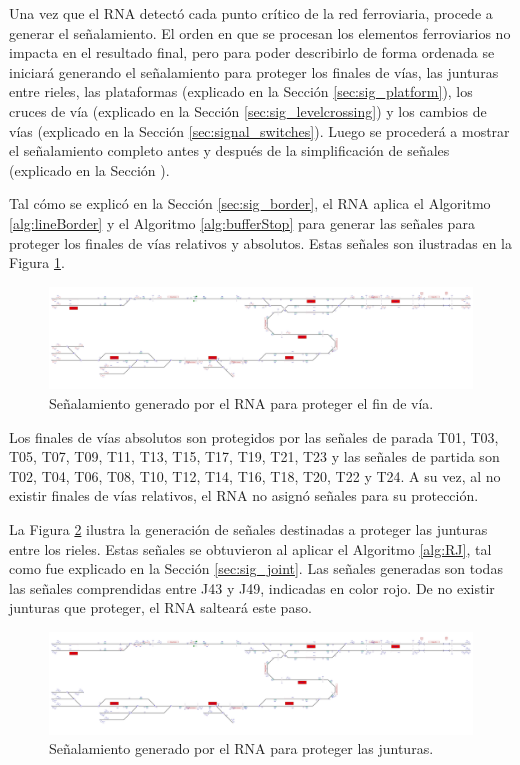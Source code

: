 	Una vez que el RNA detectó cada punto crítico de la red ferroviaria, procede a generar el señalamiento. El orden en que se procesan los elementos ferroviarios no impacta en el resultado final, pero para poder describirlo de forma ordenada se iniciará generando el señalamiento para proteger los finales de vías, las junturas entre rieles, las plataformas (explicado en la Sección \ref{sec:sig_platform}), los cruces de vía (explicado en la Sección \ref{sec:sig_levelcrossing}) y los cambios de vías (explicado en la Sección \ref{sec:signal_switches}). Luego se procederá a mostrar el señalamiento completo antes y después de la simplificación de señales (explicado en la Sección \label{sec:simplificacion}). 
	
	Tal cómo se explicó en la Sección \ref{sec:sig_border}, el RNA aplica el Algoritmo \ref{alg:lineBorder} y el Algoritmo \ref{alg:bufferStop} para generar las señales para proteger los finales de vías relativos y absolutos. Estas señales son ilustradas en la Figura \ref{fig:EJ3_3}.
		
	\begin{figure}[H]
		\centering
		\includegraphics[width=1\textwidth]{resultados-obtenidos/ejemplo3/images/3_step1.png}
		\centering\caption{Señalamiento generado por el RNA para proteger el fin de vía.}
		\label{fig:EJ3_3}
	\end{figure}
	
	Los finales de vías absolutos son protegidos por las señales de parada T01, T03, T05, T07, T09, T11, T13, T15, T17, T19, T21, T23 y las señales de partida son T02, T04, T06, T08, T10, T12, T14, T16, T18, T20, T22 y T24. A su vez, al no existir finales de vías relativos, el RNA no asignó señales para su protección.
	
	La Figura \ref{fig:EJ3_4} ilustra la generación de señales destinadas a proteger las junturas entre los rieles. Estas señales se obtuvieron al aplicar el Algoritmo \ref{alg:RJ}, tal como fue explicado en la Sección \ref{sec:sig_joint}. Las señales generadas son todas las señales comprendidas entre J43 y J49, indicadas en color rojo. De no existir junturas que proteger, el RNA salteará este paso.
		
	\begin{figure}[H]
		\centering
		\includegraphics[width=1\textwidth]{resultados-obtenidos/ejemplo3/images/3_step2.png}
		\centering\caption{Señalamiento generado por el RNA para proteger las junturas.}
		\label{fig:EJ3_4}
	\end{figure}
	
